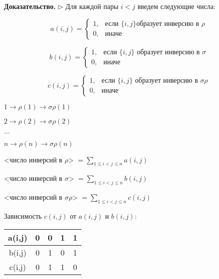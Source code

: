 \bigskip
\textbf{Доказательство.} $\rhd$ Для каждой пары $i < j$ введем следующие числа:


\begin{equation*}
	a(i,j) = \begin{cases}
		1, &\text{если }  \{i, j \} \text{образует инверсию в } \rho \\
		0, &\text{иначе}
	\end{cases}
\end{equation*}

\begin{equation*}
	b(i,j) = \begin{cases}
		1, &\text{если }  \{i, j \} \text{ образует инверсию в } \sigma \\
		0, &\text{иначе}
	\end{cases}
\end{equation*}

\begin{equation*}
	c(i,j) = \begin{cases}
		1, &\text{если }  \{i, j \} \text{ образует инверсию в } \sigma \rho \\
		0, &\text{иначе}
	\end{cases}
\end{equation*}

\bigskip
$1 \rightarrow \rho (1) \rightarrow \sigma \rho (1)$

$2 \rightarrow \rho (2) \rightarrow \sigma \rho (2)$

$\dots$

$n \rightarrow \rho (n) \rightarrow \sigma \rho (n)$

\bigskip
<число инверсий в $\rho$> $= \sum\limits_{1 \leq i < j \leq n} a(i, j) $

\bigskip

<число инверсий в $\sigma$> $= \sum\limits_{1 \leq i < j \leq n} b(i, j) $

\bigskip

<число инверсий в $\sigma \rho$> $= \sum\limits_{1 \leq i < j \leq n} c(i, j) $

\bigskip
Зависимость $c(i,j)$ от $a(i,j)$ и $b(i,j)$:

\begin{table}[!ht]
		\begin{tabular}{c|c|c|c|c}
    	a(i,j) & 0 & 0 & 1 & 1 \\
        \hline
       b(i,j) & 0 & 1 & 0 & 1 \\
       \hline
          c(i,j) & 0 & 1 & 1 & 0 \\
		\end{tabular}
\end{table}

